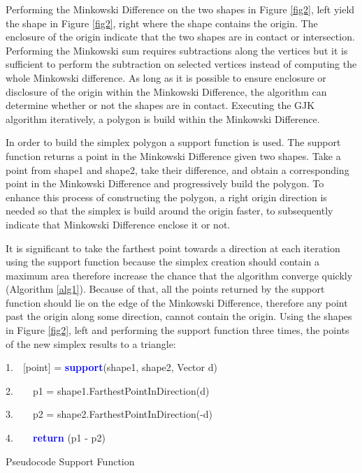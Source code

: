 \documentclass[times,12pt]{ACME2015article}
\newenvironment{lyxcode}
{\par\begin{list}{}{
\setlength{\rightmargin}{\leftmargin}
\setlength{\listparindent}{0pt}%
\raggedright
\setlength{\itemsep}{0pt}
\setlength{\parsep}{0pt}
\normalfont\ttfamily}%
 \item[]}
{\end{list}}
\begin{document}
Performing the Minkowski Difference on the two shapes in Figure \ref{fig2}, left yield the shape in Figure \ref{fig2}, right where the shape contains the origin. The enclosure of the origin indicate that the two shapes are in contact or intersection. Performing the Minkowski sum requires subtractions along the vertices but it is sufficient to perform the subtraction on selected vertices instead of computing the whole Minkowski difference. As long as it is possible to ensure enclosure or disclosure of the origin within the Minkowski Difference, the algorithm can determine whether or not the shapes are in contact. Executing the GJK algorithm iteratively, a polygon is build within the Minkowski Difference.

In order to build the simplex polygon a support function is used. The support function returns a point in the Minkowski Difference given two shapes. Take a point from shape1 and shape2, take their difference, and obtain a corresponding point in the Minkowski Difference and progressively build the polygon. To enhance this process of constructing the polygon, a right origin direction is needed so that the simplex is build around the origin faster, to subsequently indicate that Minkowski Difference enclose it or not. 

It is significant to take the farthest point towards a direction at each iteration using the support function because the simplex creation should contain a maximum area therefore increase the chance that the algorithm converge quickly (Algorithm \ref{alg1}). Because of that, all the points returned by the support function should lie on the edge of the Minkowski Difference, therefore any point past the origin along some direction, cannot contain the origin. Using the shapes in Figure \ref{fig2}, left and performing the support function three times, the points of the new simplex results to a triangle:

\begin{algorithm}
\begin{lyxcode}
1.~~[point] = \textbf{\textcolor{blue}{support}}(shape1, shape2, Vector d) 

2.~~~~p1 = shape1.FarthestPointInDirection(d)

3.~~~~p2 = shape2.FarthestPointInDirection(-d)

4.~~~~\textbf{\textcolor{blue}{return}} (p1 -  p2)

\end{lyxcode}
\protect\caption{\label{alg1}Pseudocode Support Function}
\end{algorithm}
\end{document}

